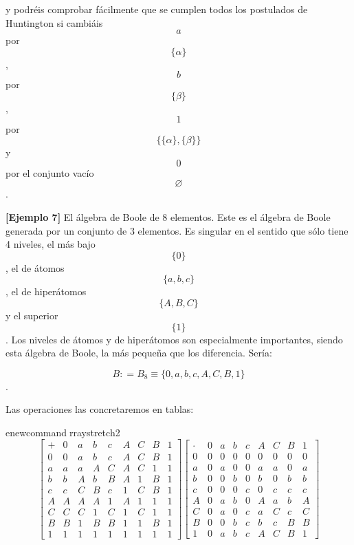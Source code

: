   y podréis comprobar fácilmente que se cumplen todos los postulados de
  Huntington si cam\-biáis \[a\] por \[\{\alpha\}\], \[b\] por
  \[\{\beta\}\], \[1\] por \[\{{{\{\alpha\}},{\{\beta\}}}\}\] y \[0\]
  por el conjunto vacío \[\varnothing\].

  \textbf{{[}Ejemplo 7{]}} El álgebra de Boole de 8 elementos. Este es
  el álgebra de Boole generada por un conjunto de 3 elementos. Es
  singular en el sentido que sólo tiene 4 niveles, el más bajo
  \[\{ 0\}\], el de átomos \[\{{a,b,c}\}\], el de hiperátomos
  \[\{{A,B,C}\}\] y el superior \[\{ 1\}\]. Los niveles de átomos y de
  hiperátomos son especialmente importantes, siendo esta álge\-bra de
  Boole, la más pequeña que los diferencia. Sería:

  \[B{{: = B_{8}} \equiv {\{{0,a,b,c,A,C,B,1}\}}}\].

  Las operaciones las concretaremos en tablas:

  \setcounter{MaxMatrixCols}{20}
  \setlength{\arraycolsep}{8pt} %
  
enewcommand{rraystretch}{2}
  \[\begin{bmatrix}
   + & 0 & a & b & c & A & C & B & 1 \\
  0 & 0 & a & b & c & A & C & B & 1 \\
  a & a & a & A & C & A & C & 1 & 1 \\
  b & b & A & b & B & A & 1 & B & 1 \\
  c & c & C & B & c & 1 & C & B & 1 \\
  A & A & A & A & 1 & A & 1 & 1 & 1 \\
  C & C & C & 1 & C & 1 & C & 1 & 1 \\
  B & B & 1 & B & B & 1 & 1 & B & 1 \\
  1 & 1 & 1 & 1 & 1 & 1 & 1 & 1 & 1
  \end{bmatrix}\begin{bmatrix}
   \cdot & 0 & a & b & c & A & C & B & 1 \\
  0 & 0 & 0 & 0 & 0 & 0 & 0 & 0 & 0 \\
  a & 0 & a & 0 & 0 & a & a & 0 & a \\
  b & 0 & 0 & b & 0 & b & 0 & b & b \\
  c & 0 & 0 & 0 & c & 0 & c & c & c \\
  A & 0 & a & b & 0 & A & a & b & A \\
  C & 0 & a & 0 & c & a & C & c & C \\
  B & 0 & 0 & b & c & b & c & B & B \\
  1 & 0 & a & b & c & A & C & B & 1
  \end{bmatrix}\]

